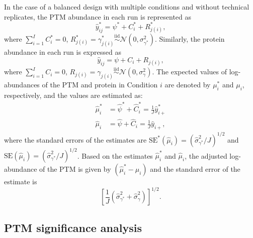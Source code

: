 \documentclass{mcp}
\begin{document}
In the case of a balanced design with multiple conditions and without technical replicates, the PTM abundance in each run is represented as 
\[
\hat{y}_{ij}^{\ast} = \psi^{\ast} + C_{i}^{\ast} + R_{j(i)}^{\ast},
\]
where $\sum_{i=1}^{I} C_{i}^{\ast} = 0$, $R_{j(i)}^{\ast} = \gamma_{j(i)}^{\ast} \stackrel{\text{iid}}{\sim} \mathcal{N}(0, \sigma_{\gamma^{\ast}}^{2})$. 
Similarly, the protein abundance in each run is expressed as
\[
\hat{y}_{ij} = \psi + C_{i} + R_{j(i)},
\]
where $\sum_{i=1}^{I} C_{i} = 0$, $R_{j(i)} = \gamma_{j(i)} \stackrel{\text{iid}}{\sim} \mathcal{N}(0, \sigma_{\gamma}^{2})$. The expected values of log-abundances of the PTM and protein in Condition $i$ are denoted by $\mu_{i}^{\ast}$ and $\mu_{i}$, respectively, and the values are estimated as: 
\begin{align*}
\hat{\mu}_{i}^{\ast} &= \hat{\psi}^{\ast} + \hat{C}_{i}^{\ast} = \frac{1}{J} \hat{y}_{i+}^{\ast} \\
\hat{\mu}_{i} &= \hat{\psi} + \hat{C}_{i} = \frac{1}{J} \hat{y}_{i+},
\end{align*}
where the standard errors of the estimates are $\mathrm{SE^{\ast}}(\hat{\mu}_{i}) = (\hat{\sigma}_{\gamma^{\ast}}^{2} / J)^{1/2}$ and $\mathrm{SE}(\hat{\mu}_{i}) = (\hat{\sigma}_{\gamma^{\ast}}^{2} / J)^{1/2}$.
Based on the estimates $\hat{\mu}_{i}^{\ast}$ and $\hat{\mu}_{i}$, the adjusted log-abundance of the PTM is given by $(\hat{\mu}_{i}^{\ast} - \hat{\mu}_{i})$ and the standard error of the estimate is 
\[
\left[ \frac{1}{J} \left( \hat{\sigma}_{\gamma^{\ast}}^{2} + \hat{\sigma}_{\gamma}^{2} \right) \right]^{1/2}.
\]


\subsection{PTM significance analysis}
\label{sec:test}
\end{document}
